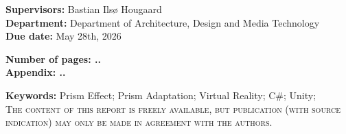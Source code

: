 \begin{minipage}{0.5\textwidth}
\textbf{Supervisors:} Bastian Ilsø Hougaard \\
\textbf{Department:} Department of Architecture, Design and Media Technology \\
\textbf{Due date:} May 28th, 2026\\
\end{minipage}
\begin{minipage}{0.5\textwidth}
\begin{flushright}
\textbf{Number of pages: ..} \\
\textbf{Appendix: ..} \\
\end{flushright}
\end{minipage}

\begin{center}
  
  \textbf{Keywords:} Prism Effect; Prism Adaptation; Virtual Reality; C\#; Unity;   \\

    \textsc{The content of this report is freely available, but publication (with source indication) may only be made in agreement with the authors.}

\end{center}
